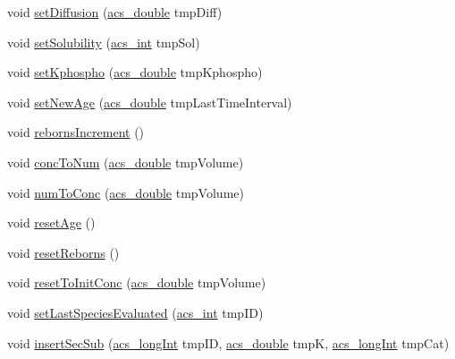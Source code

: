 \begin{DoxyCompactItemize}
\item 
void \hyperlink{classspecies_ab4b4adbc3c26e3a8c81a090c9d1330e3}{set\-Diffusion} (\hyperlink{acs__headers_8h_ab776853a005fcbf56af0424a2a4dd607}{acs\-\_\-double} tmp\-Diff)
\item 
void \hyperlink{classspecies_a27c2d0448e1f56e0962132d8d360fc07}{set\-Solubility} (\hyperlink{acs__headers_8h_a8d277355641a098190360234e2ebde35}{acs\-\_\-int} tmp\-Sol)
\item 
void \hyperlink{classspecies_a4d33fdb252e1884841f9c671ce25973c}{set\-Kphospho} (\hyperlink{acs__headers_8h_ab776853a005fcbf56af0424a2a4dd607}{acs\-\_\-double} tmp\-Kphospho)
\item 
void \hyperlink{classspecies_aa73ab15fb28aefd3b0c6b19e7c9bb944}{set\-New\-Age} (\hyperlink{acs__headers_8h_ab776853a005fcbf56af0424a2a4dd607}{acs\-\_\-double} tmp\-Last\-Time\-Interval)
\item 
void \hyperlink{classspecies_a90d5fc1d90637f2245e8b0ecf228ddfa}{reborns\-Increment} ()
\item 
void \hyperlink{classspecies_a9842732a5dbe0eb67e24148b5d7ae4a2}{conc\-To\-Num} (\hyperlink{acs__headers_8h_ab776853a005fcbf56af0424a2a4dd607}{acs\-\_\-double} tmp\-Volume)
\item 
void \hyperlink{classspecies_a23c19a53390142ba690d0f3db0520d05}{num\-To\-Conc} (\hyperlink{acs__headers_8h_ab776853a005fcbf56af0424a2a4dd607}{acs\-\_\-double} tmp\-Volume)
\item 
void \hyperlink{classspecies_a911d4db36e84690d19abb2902a734524}{reset\-Age} ()
\item 
void \hyperlink{classspecies_a4884d8bce59ddb79e87e08f3ed16633f}{reset\-Reborns} ()
\item 
void \hyperlink{classspecies_acc180a103e6681da2add266aafda3eb9}{reset\-To\-Init\-Conc} (\hyperlink{acs__headers_8h_ab776853a005fcbf56af0424a2a4dd607}{acs\-\_\-double} tmp\-Volume)
\item 
void \hyperlink{classspecies_a8daa007da55f042b9c436f956836f4d8}{set\-Last\-Species\-Evaluated} (\hyperlink{acs__headers_8h_a8d277355641a098190360234e2ebde35}{acs\-\_\-int} tmp\-I\-D)
\item 
void \hyperlink{classspecies_a0da8d53a216583f7790b12362da376a3}{insert\-Sec\-Sub} (\hyperlink{acs__headers_8h_a19319d75f02db4308bc5c0026d98cd85}{acs\-\_\-long\-Int} tmp\-I\-D, \hyperlink{acs__headers_8h_ab776853a005fcbf56af0424a2a4dd607}{acs\-\_\-double} tmp\-K, \hyperlink{acs__headers_8h_a19319d75f02db4308bc5c0026d98cd85}{acs\-\_\-long\-Int} tmp\-Cat)
\item 

\end{DoxyCompactItemize}
